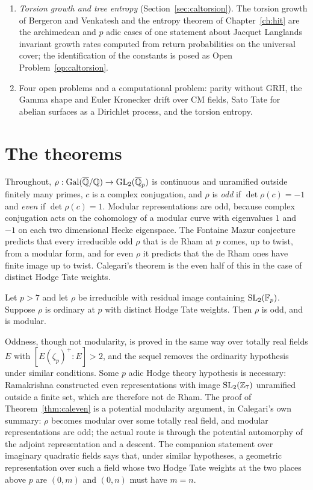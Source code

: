 \begin{enumerate}
\item[(6)] \emph{Torsion growth and tree entropy} (Section~\ref{sec:caltorsion}). The torsion growth of Bergeron and Venkatesh and the entropy theorem of Chapter~\ref{ch:hit} are the archimedean and $p$ adic cases of one statement about Jacquet Langlands invariant growth rates computed from return probabilities on the universal cover; the identification of the constants is posed as Open Problem~\ref{op:caltorsion}.
\item[(7)] Four open problems and a computational problem: parity without GRH, the Gamma shape and Euler Kronecker drift over CM fields, Sato Tate for abelian surfaces as a Dirichlet process, and the torsion entropy.
\end{enumerate}

\section{The theorems}\label{sec:calthm}

Throughout, $\rho:\operatorname{Gal}(\overline{\mathbb{Q}}/\mathbb{Q})\to\mathrm{GL}_2(\overline{\mathbb{Q}}_p)$ is continuous and unramified outside finitely many primes, $c$ is a complex conjugation, and $\rho$ is \emph{odd} if $\det\rho(c)=-1$ and \emph{even} if $\det\rho(c)=1$. Modular representations are odd, because complex conjugation acts on the cohomology of a modular curve with eigenvalues $1$ and $-1$ on each two dimensional Hecke eigenspace. The Fontaine Mazur conjecture \cite{fontainemazur1995} predicts that every irreducible odd $\rho$ that is de Rham at $p$ comes, up to twist, from a modular form, and for even $\rho$ it predicts that the de Rham ones have finite image up to twist. Calegari's theorem is the even half of this in the case of distinct Hodge Tate weights.

\begin{theorem}\label{thm:caleven}
Let $p>7$ and let $\rho$ be irreducible with residual image containing $\mathrm{SL}_2(\mathbb F_p)$. Suppose $\rho$ is ordinary at $p$ with distinct Hodge Tate weights. Then $\rho$ is odd, and is modular.
\end{theorem}

Oddness, though not modularity, is proved in the same way over totally real fields $E$ with $[E(\zeta_p)^+:E]>2$, and the sequel \cite{calegari2012} removes the ordinarity hypothesis under similar conditions. Some $p$ adic Hodge theory hypothesis is necessary: Ramakrishna \cite{ramakrishna2002} constructed even representations with image $\mathrm{SL}_2(\mathbb{Z}_7)$ unramified outside a finite set, which are therefore not de Rham. The proof of Theorem~\ref{thm:caleven} is a potential modularity argument, in Calegari's own summary: $\rho$ becomes modular over some totally real field, and modular representations are odd; the actual route is through the potential automorphy of the adjoint representation and a descent. The companion statement over imaginary quadratic fields says that, under similar hypotheses, a geometric representation over such a field whose two Hodge Tate weights at the two places above $p$ are $(0,m)$ and $(0,n)$ must have $m=n$.

